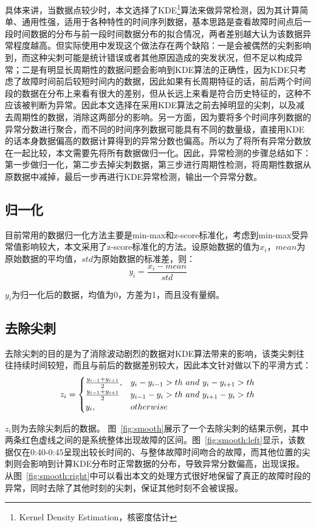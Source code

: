 具体来讲，当数据点较少时，本文选择了KDE\footnote{Kernel Density Estimation，核密度估计}算法来做异常检测，因为其计算简单、通用性强，适用于各种特性的时间序列数据，基本思路是查看故障时间点后一段时间数据的分布与前一段时间数据分布的拟合情况，两者差别越大认为该数据异常程度越高。但实际使用中发现这个做法存在两个缺陷：一是会被偶然的尖刺影响到，而这种尖刺可能是统计错误或者其他原因造成的突发状况，但不足以构成异常；二是有明显长周期性的数据问题会影响到KDE算法的正确性，因为KDE只考虑了故障时间前后较短时间内的数据，因此如果有长周期特征的话，前后两个时间段的数据在分布上来看有很大的差别，但从长远上来看是符合历史特征的，这种不应该被判断为异常。因此本文选择在采用KDE算法之前去掉明显的尖刺，以及减去周期性的数据，消除这两部分的影响。另一方面，因为要将多个时间序列数据的异常分数进行聚合，而不同的时间序列数据可能具有不同的数量级，直接用KDE的话本身数据偏高的数据计算得到的异常分数也偏高。所以为了将所有异常分数放在一起比较，本文需要先将所有数据做归一化。因此，异常检测的步骤总结如下：第一步做归一化，第二步去掉尖刺数据，第三步进行周期性检测，将周期性数据从原数据中减掉，最后一步再进行KDE异常检测，输出一个异常分数。
\subsection{归一化}
目前常用的数据归一化方法主要是min-max和z-score标准化，考虑到min-max受异常值影响较大，本文采用了z-score标准化的方法。设原始数据的值为$x_i$，$mean$为原始数据的平均值，$std$为原始数据的标准差，则：
\begin{equation*}
y_i = \frac{x_i-mean}{std}
\end{equation*}

$y_i$为归一化后的数据，均值为0，方差为1，而且没有量纲。
\subsection{去除尖刺}
去除尖刺的目的是为了消除波动剧烈的数据对KDE算法带来的影响，该类尖刺往往持续时间较短，而且与前后的数据差别较大，因此本文针对做以下的平滑方式：
\begin{equation*}
z_i = \begin{cases} \frac{y_{i-1} + y_{i+1}}{2}, & y_i - y_{i-1} > th\ and\ y_i - y_{i+1} > th \cr \frac{y_{i-1} + y_{i+1}}{2} & y_{i-1} - y_i > th\ and\ y_{i+1} - y_i > th \cr y_i, & otherwise  \end{cases}
\end{equation*}

$z_i$则为去除尖刺后的数据。
图~\ref{fig:smooth}展示了一个去除尖刺的结果示例，其中两条红色虚线之间的是系统整体出现故障的区间。图~\ref{fig:smooth:left}显示，该数据仅在0:40-0:45呈现出较长时间的、与整体故障时间吻合的故障，而其他位置的尖刺则会影响到计算KDE分布时正常数据的分布，导致异常分数偏高，出现误报。从图~\ref{fig:smooth:right}中可以看出本文的处理方式很好地保留了真正的故障时段的异常，同时去除了其他时刻的尖刺，保证其他时刻不会被误报。

